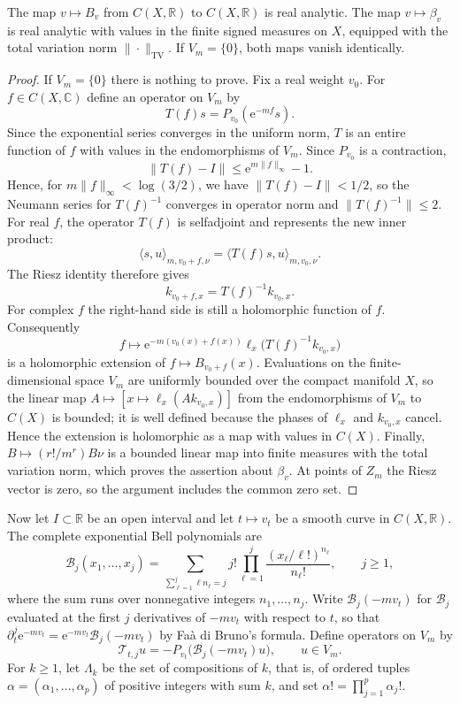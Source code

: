 \begin{proposition}\label{prop:partial-kernel-weight-analyticity}
The map $v\mapsto B_v$ from $C(X,\mathbb R)$ to $C(X,\mathbb R)$ is real analytic. The map $v\mapsto\beta_v$ is real analytic with values in the finite signed measures on $X$, equipped with the total variation norm $\|\cdot\|_{\mathrm{TV}}$. If $V_m=\{0\}$, both maps vanish identically.
\end{proposition}
\begin{proof}
If $V_m=\{0\}$ there is nothing to prove. Fix a real weight $v_0$. For $f\in C(X,\mathbb C)$ define an operator on $V_m$ by
\[
 T(f)s=P_{v_0}(\mathrm{e}^{-mf}s).
\]
Since the exponential series converges in the uniform norm, $T$ is an entire function of $f$ with values in the endomorphisms of $V_m$. Since $P_{v_0}$ is a contraction,
\[
 \|T(f)-I\|\leq\mathrm{e}^{m\|f\|_\infty}-1.
\]
Hence, for $m\|f\|_\infty<\log(3/2)$, we have $\|T(f)-I\|<1/2$, so the Neumann series for $T(f)^{-1}$ converges in operator norm and $\|T(f)^{-1}\|\leq2$. For real $f$, the operator $T(f)$ is selfadjoint and represents the new inner product:
\[
 \langle s,u\rangle_{m,v_0+f,\nu}
 =\langle T(f)s,u\rangle_{m,v_0,\nu}.
\]
The Riesz identity therefore gives
\[
 k_{v_0+f,x}=T(f)^{-1}k_{v_0,x}.
\]
For complex $f$ the right-hand side is still a holomorphic function of $f$. Consequently
\[
 f\longmapsto
 \mathrm{e}^{-m(v_0(x)+f(x))}
       \ell_x\bigl(T(f)^{-1}k_{v_0,x}\bigr)
\]
is a holomorphic extension of $f\mapsto B_{v_0+f}(x)$. Evaluations on the finite-dimensional space $V_m$ are uniformly bounded over the compact manifold $X$, so the linear map $A\mapsto[x\mapsto\ell_x(Ak_{v_0,x})]$ from the endomorphisms of $V_m$ to $C(X)$ is bounded; it is well defined because the phases of $\ell_x$ and $k_{v_0,x}$ cancel. Hence the extension is holomorphic as a map with values in $C(X)$. Finally, $B\mapsto(r!/m^r)B\nu$ is a bounded linear map into finite measures with the total variation norm, which proves the assertion about $\beta_v$. At points of $Z_m$ the Riesz vector is zero, so the argument includes the common zero set.
\end{proof}

Now let $I\subset\mathbb R$ be an open interval and let $t\mapsto v_t$ be a smooth curve in $C(X,\mathbb R)$. The complete exponential Bell polynomials are
\[
 \mathcal B_j(x_1,\ldots,x_j)
 =\sum_{\sum_{\ell=1}^j\ell n_\ell=j}
     j!\prod_{\ell=1}^j
     \frac{(x_\ell/\ell!)^{n_\ell}}{n_\ell!},
 \qquad j\geq1,
\]
where the sum runs over nonnegative integers $n_1,\ldots,n_j$. Write $\mathcal B_j(-mv_t)$ for $\mathcal B_j$ evaluated at the first $j$ derivatives of $-mv_t$ with respect to $t$, so that $\partial_t^j\mathrm{e}^{-mv_t}=\mathrm{e}^{-mv_t}\mathcal B_j(-mv_t)$ by Fa\`a di Bruno's formula. Define operators on $V_m$ by
\[
 \mathcal T_{t,j}u=-P_{v_t}\bigl(\mathcal B_j(-mv_t)u\bigr),
 \qquad u\in V_m.
\]
For $k\geq1$, let $\Lambda_k$ be the set of compositions of $k$, that is, of ordered tuples $\alpha=(\alpha_1,\ldots,\alpha_p)$ of positive integers with sum $k$, and set $\alpha!=\prod_{j=1}^p\alpha_j!$.

